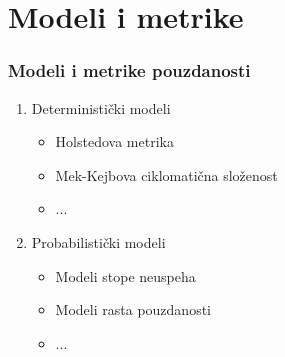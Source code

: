 \documentclass{beamer}
\begin{document}
\section{Modeli i metrike}
\begin{frame}
\frametitle{Modeli i metrike pouzdanosti}

\begin{enumerate}
\item Deterministički modeli
\begin{itemize}
\item Holstedova metrika
\item Mek-Kejbova ciklomatična složenost
\item ...
\end{itemize}
\item Probabilistički modeli
\begin{itemize}
\item Modeli stope neuspeha
\item Modeli rasta pouzdanosti
\item ...
\end{itemize}
\end{enumerate}

\end{frame}
\end{document}
